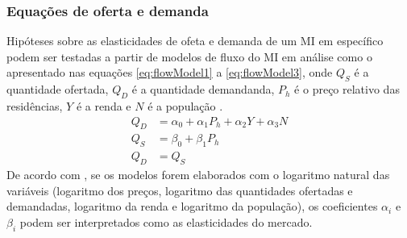 \documentclass[
	12pt,				%
	oneside,			%
	a4paper,			%
	chapter=TITLE,		%
	section=TITLE,		%
	english,			%
	brazil				%
	]{abntex2}
\begin{document}
\hypertarget{equauxe7uxf5es-de-oferta-e-demanda}{%
\subsubsection{Equações de oferta e demanda}\label{equauxe7uxf5es-de-oferta-e-demanda}}

Hipóteses sobre as elasticidades de ofeta e demanda de um \gls{MI} em específico
podem ser testadas a partir de modelos de fluxo do \gls{MI} em análise como o
apresentado nas equações \eqref{eq:flowModel1} a \eqref{eq:flowModel3}, onde \(Q_S\)
é a quantidade ofertada, \(Q_D\) é a quantidade demandanda, \(P_h\) é o preço
relativo das residências, \(Y\) é a renda e \(N\) é a população
\autocite[ p.~282]{longrunsupplyelasticity}.
\begin{align} 
Q_D &= \alpha_0 + \alpha_1 P_h + \alpha_2 Y + \alpha_3 N \label{eq:flowModel1}\\ 
Q_S &= \beta_0 + \beta_1 P_h \label{eq:flowModel2}\\
Q_D &= Q_S \label{eq:flowModel3}
\end{align}
De acordo com \textcite[p.~282]{longrunsupplyelasticity}, se os modelos forem elaborados
com o logaritmo natural das variáveis (logaritmo dos preços, logaritmo das
quantidades ofertadas e demandadas, logaritmo da renda e logaritmo da
população), os coeficientes \(\alpha_i\) e \(\beta_i\) podem ser interpretados
como as elasticidades do mercado.
\end{document}
